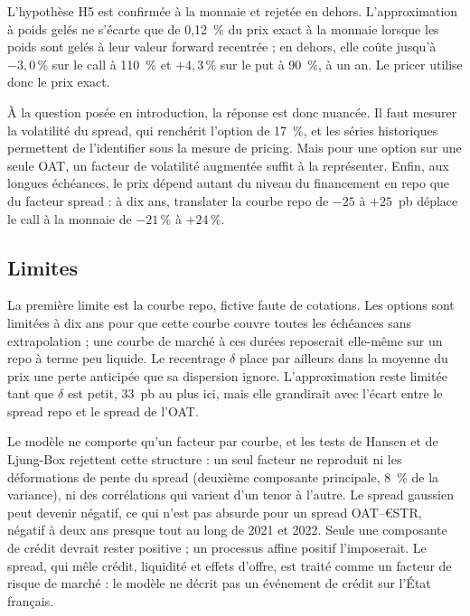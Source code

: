 L'hypothèse H5 est confirmée à la monnaie et rejetée en dehors. L'approximation à poids gelés ne s'écarte que de
0,12~\% du prix exact à la monnaie lorsque les poids sont gelés à leur valeur forward recentrée ; en dehors, elle
coûte jusqu'à $-3{,}0\,\%$ sur le call à 110~\% et $+4{,}3\,\%$ sur le put à 90~\%, à un an. Le pricer utilise donc le
prix exact.

À la question posée en introduction, la réponse est donc nuancée. Il faut mesurer la volatilité du spread, qui
renchérit l'option de 17~\%, et les séries historiques permettent de l'identifier sous la mesure de pricing. Mais
pour une option sur une seule OAT, un facteur de volatilité augmentée suffit à la représenter. Enfin, aux longues
échéances, le prix dépend autant du niveau du financement en repo que du facteur spread : à dix ans, translater la
courbe repo de $-25$ à $+25$~pb déplace le call à la monnaie de $-21\,\%$ à $+24\,\%$.

\subsection*{Limites}

La première limite est la courbe repo, fictive faute de cotations. Les options sont limitées à dix ans pour que
cette courbe couvre toutes les échéances sans extrapolation ; une courbe de marché à ces durées reposerait
elle-même sur un repo à terme peu liquide. Le recentrage $\delta$ place par ailleurs dans la moyenne du prix une
perte anticipée que sa dispersion ignore. L'approximation reste limitée tant que $\delta$ est petit, 33~pb au plus
ici, mais elle grandirait avec l'écart entre le spread repo et le spread de l'OAT.

Le modèle ne comporte qu'un facteur par courbe, et les tests de Hansen et de Ljung-Box rejettent cette structure :
un seul facteur ne reproduit ni les déformations de pente du spread (deuxième composante principale, 8~\% de la
variance), ni des corrélations qui varient d'un tenor à l'autre. Le spread gaussien peut devenir négatif, ce qui
n'est pas absurde pour un spread OAT–€STR, négatif à deux ans presque tout au long de 2021 et 2022. Seule une
composante de crédit devrait rester positive ; un processus affine positif \citep[cours~1]{MPR2025} l'imposerait.
Le spread, qui mêle crédit, liquidité et effets d'offre, est traité comme un facteur de risque de marché : le modèle
ne décrit pas un événement de crédit sur l'État français.

